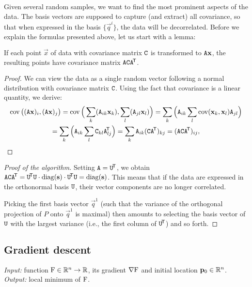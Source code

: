 Given several random samples, we want to find the most prominent aspects of the data.
The basis vectors are supposed to capture (and extract) all covariance, so that when expressed in the basis $\{\vec q^i\}$, the data will be decorrelated.
Before we explain the formulas presented above, let us start with a lemma:

\begin{lemma}
If each point $\vec x$ of data with covariance matrix $\mathtt{C}$ is transformed to $\mathtt{A} \mathbf{x}$, the resulting points have covariance matrix $\mathtt{A} \mathtt{C} \mathtt{A} ^{\!\mathsf{T}}$.
\end{lemma}

\begin{proof}
We can view the data as a single random vector following a normal distribution with covariance matrix $\mathtt{C}$.
Using the fact that covariance is a linear quantity, we derive:
\begin{multline}
\operatorname{\mathrm{cov}}\big( (\mathtt{A} \mathbf{x})_i, (\mathtt{A} \mathbf{x})_j \big) = \operatorname{\mathrm{cov}}\Big( \sum_k(\mathtt{A}_{ik} \mathbf{x}_k), \sum_l(\mathtt{A}_{jl} \mathbf{x}_l) \Big) = \sum_k \Big( \mathtt{A}_{ik} \sum_l \operatorname{\mathrm{cov}}( \mathbf{x}_k, \mathbf{x}_l ) \mathtt{A}_{jl} \Big) \\
= \sum_k \Big( \mathtt{A}_{ik} \sum_l \mathtt{C}_{kl} \mathtt{A}_{lj}^{\!\mathsf{T}} \Big) = \sum_k \mathtt{A}_{ik} (\mathtt{C} \mathtt{A} ^{\!\mathsf{T}})_{kj} = (\mathtt{A} \mathtt{C} \mathtt{A}^{\!\mathsf{T}})_{ij},
\end{multline}
\end{proof}

\begin{proof}[Proof of the algorithm]
Setting $\mathtt{A} = \mathtt{U}^{\!\mathsf{T}}$, we obtain $\mathtt{A} \mathtt{C} \mathtt{A} ^{\!\mathsf{T}} = \mathtt{U}^{\!\mathsf{T}} \mathtt{U} \cdot \mathrm{diag}(\mathbf{s}) \cdot \mathtt{U}^{\!\mathsf{T}} \mathtt{U} = \mathrm{diag}(\mathbf{s})$.
This means that if the data are expressed in the orthonormal basis  $\mathtt{U}$, their vector components are no longer correlated.

Picking the first basis vector $\vec q^1$ (such that the variance of the orthogonal projection of $P$ onto $\vec q^1$ is maximal) then amounts to selecting the basis vector of $\mathtt{U}$ with the largest variance (i.e., the first column of $\mathtt{U} ^{\!\mathsf{T}}$) and so forth.

\end{proof}

\subsection{Gradient descent}
\textit{Input:} function $\mathrm{F} \in \mathbb{R}^n \to \mathbb{R}$, its gradient $\nabla \mathrm{F}$ and initial location $\mathbf{p}_0 \in \mathbb{R}^n$.\\
\textit{Output:} local minimum of $\mathrm{F}$.\\

